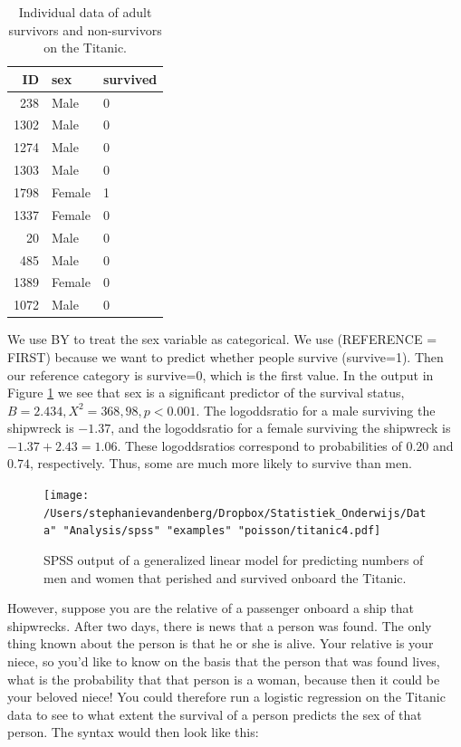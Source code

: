 \documentclass[]{book}\usepackage[]{graphicx}\usepackage[]{color}
\begin{document}
\begin{table}[ht]
\centering
\caption{Individual data of adult survivors and non-survivors on the Titanic.} 
\label{tab:gen_28}
\begin{tabular}{rll}
  \hline
ID & sex & survived \\ 
  \hline
238 & Male & 0 \\ 
  1302 & Male & 0 \\ 
  1274 & Male & 0 \\ 
  1303 & Male & 0 \\ 
  1798 & Female & 1 \\ 
  1337 & Female & 0 \\ 
  20 & Male & 0 \\ 
  485 & Male & 0 \\ 
  1389 & Female & 0 \\ 
  1072 & Male & 0 \\ 
   \hline
\end{tabular}
\end{table}




We use BY to treat the sex variable as categorical. We use (REFERENCE = FIRST) because we want to predict whether people survive (survive=1). Then our reference category is survive=0, which is the first value.
In the output in Figure \ref{fig:titanic4} we see that sex is a significant predictor of the survival status, $B=2.434, X^2=368,98, p<0.001$. The logoddsratio for a male surviving the shipwreck is $-1.37$, and the logoddsratio for a female surviving the shipwreck is $-1.37+2.43=1.06$. These logoddsratios correspond to probabilities of $0.20$ and $0.74$, respectively. Thus, some are much more likely to survive than men.


\begin{figure}[h]
    \begin{center}
       \texttt{[image: /Users/stephanievandenberg/Dropbox/Statistiek\_Onderwijs/Data" "Analysis/spss" "examples" "poisson/titanic4.pdf]}
    \end{center}
     \caption{SPSS output of a generalized linear model for predicting numbers of men and women that perished and survived onboard the Titanic.}
    \label{fig:titanic4}
\end{figure}

However, suppose you are the relative of a passenger onboard a ship that shipwrecks. After two days, there is news that a person was found. The only thing known about the person is that he or she is alive. Your relative is your niece, so you'd like to know on the basis that the person that was found lives, what is the probability that that person is a woman, because then it could be your beloved niece! You could therefore run a logistic regression on the Titanic data to see to what extent the survival of a person predicts the sex of that person. The syntax would then look like this:
\end{document}
